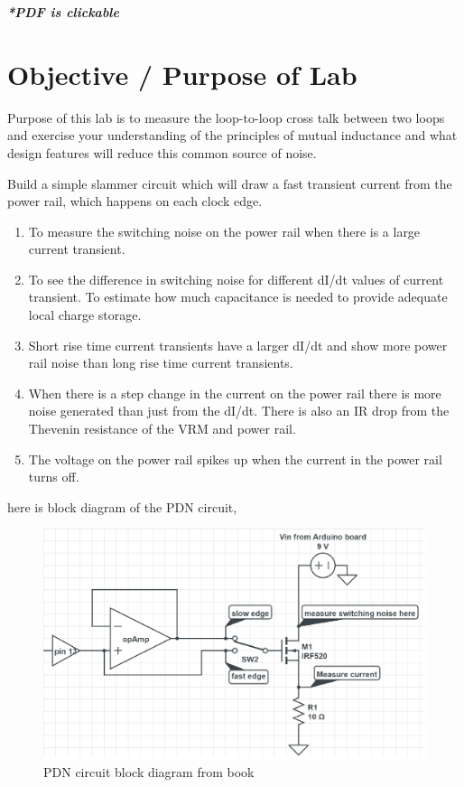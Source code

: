 \documentclass[a4paper,11pt]{article}%
\begin{document}


\pagebreak

\tableofcontents
\listoffigures
\listoftables
\vfill
\begin{center}
	\textbf{\textit{*PDF is clickable}}
\end{center}

\pagebreak

\section{Objective / Purpose of Lab}

Purpose of this lab is to measure the loop-to-loop cross talk between two loops and exercise your
understanding of the principles of mutual inductance and what design features will reduce this common
source of noise. 

Build a simple slammer circuit which will draw a fast transient current from the power rail, which happens on each clock edge.


\begin{enumerate}
	\item To measure the switching noise on the power rail when there is a large current transient.
	\item To see the difference in switching noise for different dI/dt values of current transient. To estimate how much capacitance is needed to provide adequate local charge storage.
	\item Short rise time current transients have a larger dI/dt and show more power rail noise than long rise time
	current transients.
	\item When there is a step change in the current on the power rail there is more noise generated than just from
	the dI/dt. There is also an IR drop from the Thevenin resistance of the VRM and power rail.
	\item The voltage on the power rail spikes up when the current in the power rail turns off.
\end{enumerate}



here is block diagram of the PDN circuit,


\begin{figure}[H]
	\centering
	\includegraphics[scale=0.6]{figures/pdn.png}
	\caption{PDN circuit block diagram from book}
	\label{idealbpfilter}
\end{figure}
\end{document}
